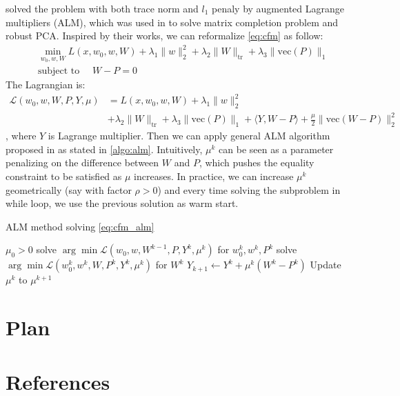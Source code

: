\documentclass{article}
\newcommand{\tr}{\text{tr}}
\newcommand{\vecc}{\text{vec}}
\begin{document}
\cite{li2015conformal} solved the problem with both trace norm and $l_1$ penaly by augmented Lagrange multipliers (ALM), which was used in \cite{lin2010augmented} to solve matrix completion problem and robust PCA. Inspired by their works, we can reformalize \cref{eq:cfm} as follow:
\begin{align}
  &\min_{w_0, w, W} L(x, w_0, w, W) + \lambda_1 \|w\|_2^2 + \lambda_2 \|W\|_{\tr} + \lambda_3 \|\vecc(P)\|_1 \label{eq:cfm_alm} \\
  & \text{subject to }\quad W - P = 0
\end{align}
The Lagrangian is:
\begin{align}
  \mathcal{L}(w_0, w, W, P, Y, \mu) &= L(x, w_0, w, W) + \lambda_1 \|w\|_2^2 \nonumber \\
  &+ \lambda_2 \|W\|_{\tr} + \lambda_3 \|\vecc(P)\|_1 + \langle Y, W - P \rangle + \frac{\mu}{2} \|\vecc(W - P)\|_2^2 \label{eq:alm}
\end{align}
, where $Y$ is Lagrange multiplier. Then we can apply general ALM algorithm proposed in \cite{lin2010augmented} as stated in \cref{algo:alm}. Intuitively, $\mu^k$ can be seen as a parameter penalizing on the difference between $W$ and $P$, which pushes the equality constraint to be satisfied as $\mu$ increases. In practice, we can increase $\mu^k$ geometrically (say with factor $\rho > 0$) and every time solving the subproblem in while loop, we use the previous solution as warm start.
\begin{algorithm} 
  \caption{ALM method solving \cref{eq:cfm_alm}}
  \label{algo:alm}
  \begin{algorithmic}[1]
    \STATE $\mu_0 > 0$
      \STATE solve $\arg\min \mathcal{L}(w_0, w, W^{k-1}, P, Y^k, \mu^k)$ for $w_{0}^k, w^k, P^k$
      \STATE solve $\arg\min \mathcal{L}(w_{0}^k, w^k, W, P^k, Y^k, \mu^k)$ for $W^k$
      \STATE $Y_{k + 1} \leftarrow Y^{k} + \mu^k (W^k - P^k)$
      \STATE Update $\mu^k$ to $\mu^{k+1}$
    \ENDWHILE
  \end{algorithmic}
\end{algorithm}



\section{Plan}


\section*{References}
\small{
\renewcommand{\section}[2]{}%
 

}
\end{document}
